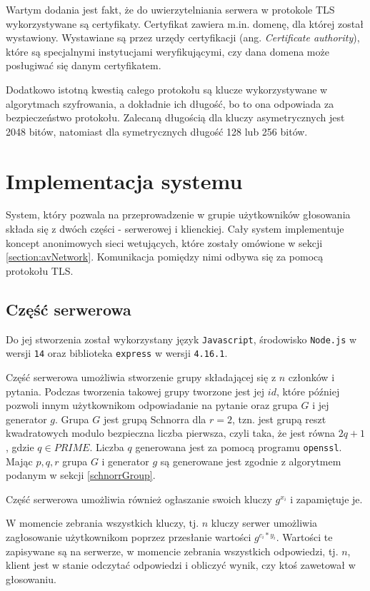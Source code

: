 \documentclass[a4paper]{article}
\begin{document}
Wartym dodania jest fakt, że do uwierzytelniania serwera w protokole TLS wykorzystywane są certyfikaty. Certyfikat zawiera m.in. domenę, dla której został wystawiony. Wystawiane są przez urzędy certyfikacji (ang. \textit{Certificate authority}), które są specjalnymi instytucjami weryfikującymi, czy dana domena może posługiwać się danym certyfikatem.

Dodatkowo istotną kwestią całego protokołu są klucze wykorzystywane w algorytmach szyfrowania, a dokładnie ich długość, bo to ona odpowiada za bezpieczeństwo protokołu. Zalecaną długością dla kluczy asymetrycznych jest 2048 bitów, natomiast dla symetrycznych długość 128 lub 256 bitów.


\section{Implementacja systemu}
System, który pozwala na przeprowadzenie w grupie użytkowników głosowania składa się z dwóch części - serwerowej i klienckiej. Cały system implementuje koncept anonimowych sieci wetujących, które zostały omówione w sekcji \ref{section:avNetwork}. Komunikacja pomiędzy nimi odbywa się za pomocą protokołu TLS.

    \subsection{Część serwerowa}
    Do jej stworzenia został wykorzystany język \texttt{Javascript}, środowisko \texttt{Node.js} w wersji \texttt{14} oraz biblioteka \texttt{express} w wersji \texttt{4.16.1}. 
    
    Część serwerowa umożliwia stworzenie grupy składającej się z $n$ członków i pytania. Podczas tworzenia takowej grupy tworzone jest jej $id$, które później pozwoli innym użytkownikom odpowiadanie na pytanie oraz grupa $G$ i jej generator $g$. Grupa $G$ jest grupą Schnorra dla $r = 2$, tzn. jest grupą reszt kwadratowych modulo bezpieczna liczba pierwsza, czyli taka, że jest równa $2q + 1$, gdzie $q \in PRIME$. Liczba $q$ generowana jest za pomocą programu \texttt{openssl}. Mając $p, q, r$ grupa $G$  i generator $g$ są generowane jest zgodnie z algorytmem podanym w sekcji \ref{schnorrGroup}.
    
    Część serwerowa umożliwia również ogłaszanie swoich kluczy $g^{x_i}$ i zapamiętuje je. 
    
    W momencie zebrania wszystkich kluczy, tj. $n$ kluczy serwer umożliwia zagłosowanie użytkownikom poprzez przesłanie wartości $g^{c_i * y_i}$. Wartości te zapisywane są na serwerze, w momencie zebrania wszystkich odpowiedzi, tj. $n$, klient jest w stanie odczytać odpowiedzi i obliczyć wynik, czy ktoś zawetował w głosowaniu.
    
\end{document}
